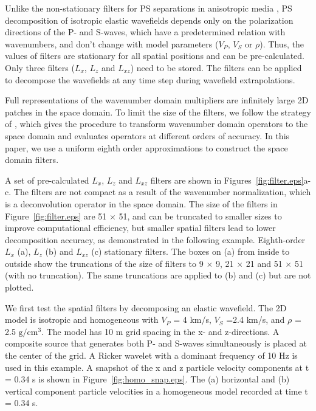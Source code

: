 \documentclass[manuscript,ulem,graphix,revised]{geophysics}
\begin{document}
Unlike the non-stationary filters for PS separations in anisotropic media \citep{yan09}, 
PS decomposition of isotropic elastic wavefields depends only on the polarization directions of the P- and S-waves, which have a predetermined relation with wavenumbers, and don't change with model parameters ($V_P$, $V_S$ or $\rho$). 
Thus, the values of filters are stationary for all spatial positions and can be pre-calculated. Only three filters ($L_x$, $L_z$ and $L_{xz}$) need to be stored. The filters can be applied to decompose the wavefields at any time step during wavefield extrapolations. 

Full representations of the wavenumber domain multipliers are infinitely large 2D patches in the space domain. To limit the size of the filters, we follow the strategy of \citet{yan09}, which gives the procedure to transform wavenumber domain operators to the space domain and evaluates operators at different orders of accuracy. 
In this paper, we use a uniform eighth order approximations to construct the space domain filters. 

A set of pre-calculated $L_x$, $L_z$ and $L_{xz}$ filters are shown in Figures~\ref{fig:filter.eps}a-c. The filters are not compact as a result of the wavenumber normalization, which is a deconvolution operator in the space domain. The size of the filters in Figure~\ref{fig:filter.eps} are 51 $\times$ 51, and can be truncated to smaller sizes to improve computational efficiency, but smaller spatial filters lead to lower decomposition accuracy, as demonstrated in the following example. 
{
Eighth-order $L_x$ (a), $L_z$ (b) and $L_{xz}$ (c) stationary filters. The boxes on (a) from inside to outside show the truncations of the size of filters to 9 $\times$ 9, 21 $\times$ 21 and 51 $\times$ 51 (with no truncation). The same truncations are applied to (b) and (c) but are not plotted.
}

We first test the spatial filters by decomposing an elastic wavefield. The 2D model is isotropic and homogeneous with $V_P$ = 4 km/s, $V_S$ =2.4 km/s, and $\rho$ = 2.5 $\mathrm{g/cm^3}$. The model has 10 m grid spacing in the x- and z-directions. A composite source that generates both P- and S-waves simultaneously is placed at the center of the grid. A Ricker wavelet with a dominant frequency of 10 Hz is used in this example. A snapshot of the x and z particle velocity components at t = 0.34 s is shown in Figure~\ref{fig:homo_snap.eps}.
{
The (a) horizontal and (b) vertical component particle velocities in a homogeneous model recorded at time t = 0.34 s.
}
\end{document}
